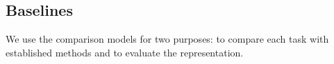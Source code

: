 
\subsection{Baselines}
\label{sec:mobiwac:setup-baselines}
We use the comparison models for two purposes: to compare each task with established methods and to evaluate the representation.

